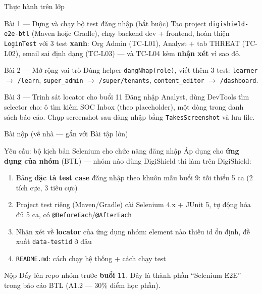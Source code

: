 \documentclass[aspectratio=169,12pt]{beamer}
\begin{document}
\begin{frame}{Thực hành trên lớp}
  \begin{block}{Bài 1 --- Dựng và chạy bộ test đăng nhập (bắt buộc)}
    Tạo project \texttt{digishield-e2e-btl} (Maven hoặc Gradle), chạy backend
    dev + frontend, hoàn thiện \texttt{LoginTest} với 3 test \textbf{xanh}:
    Org Admin (TC-L01), Analyst + tab THREAT (TC-L02), email sai định dạng
    (TC-L03) --- và TC-L04 kèm \textbf{nhận xét} vì sao đỏ.
  \end{block}

  \begin{block}{Bài 2 --- Mở rộng vai trò}
    Dùng helper \texttt{dangNhap(role)}, viết thêm 3 test:
    \texttt{learner} $\to$ \texttt{/learn},
    \texttt{super\_admin} $\to$ \texttt{/super/tenants},
    \texttt{content\_editor} $\to$ \texttt{/dashboard}.
  \end{block}

  \begin{block}{Bài 3 --- Trinh sát locator cho buổi 11}
    Đăng nhập Analyst, dùng DevTools tìm selector cho: ô tìm kiếm SOC Inbox
    (theo placeholder), một dòng trong danh sách báo cáo. Chụp screenshot sau
    đăng nhập bằng \texttt{TakesScreenshot} và lưu file.
  \end{block}
\end{frame}

\begin{frame}{Bài nộp (về nhà --- gắn với Bài tập lớn)}
  \begin{block}{Yêu cầu: bộ kịch bản Selenium cho chức năng đăng nhập}
    Áp dụng cho \textbf{ứng dụng của nhóm} (BTL) --- nhóm nào dùng DigiShield thì
    làm trên DigiShield:
    \begin{enumerate}\small
      \item Bảng \textbf{đặc tả test case} đăng nhập theo khuôn mẫu buổi 9:
            tối thiểu 5 ca (2 tích cực, 3 tiêu cực)
      \item Project test riêng (Maven/Gradle) cài Selenium 4.x + JUnit 5,
            tự động hóa đủ 5 ca, có \texttt{@BeforeEach}/\texttt{@AfterEach}
      \item Nhận xét về \textbf{locator} của ứng dụng nhóm: element nào thiếu
            id ổn định, đề xuất \texttt{data-testid} ở đâu
      \item \texttt{README.md}: cách chạy hệ thống + cách chạy test
    \end{enumerate}
  \end{block}

  \begin{alertblock}{Nộp}
    Đẩy lên repo nhóm trước \textbf{buổi 11}. Đây là thành phần
    ``Selenium E2E'' trong báo cáo BTL (A1.2 --- 30\% điểm học phần).
  \end{alertblock}
\end{frame}
\end{document}
